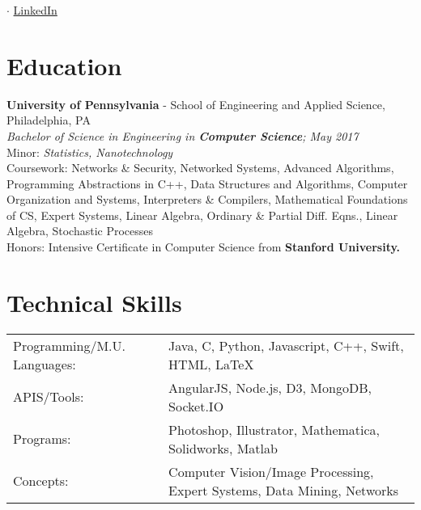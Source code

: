 





\pagestyle{empty}   %

\par{\par}

\par{ $\cdot$ \href{https://www.linkedin.com/in/jtcho}{LinkedIn} \par}
\bigskip


\section{Education}
\textbf{University of Pennsylvania} - School of Engineering and Applied Science, Philadelphia, PA\\
\textit{Bachelor of Science in Engineering in \textbf{Computer Science}; May 2017}\\
Minor: \textit{Statistics, Nanotechnology}\\
Coursework: Networks \& Security, Networked Systems, Advanced Algorithms, Programming Abstractions in C++, Data Structures and Algorithms, Computer Organization and Systems, Interpreters \& Compilers, Mathematical Foundations of CS, Expert Systems, Linear Algebra, Ordinary \& Partial Diff. Eqns., Linear Algebra, Stochastic Processes\\
Honors: Intensive Certificate in Computer Science from \textbf{Stanford University.}

\section{Technical Skills}
\begin{tabular}{l l}
    Programming/M.U. Languages:&Java, C, Python, Javascript, C++, Swift, HTML, \LaTeX\\
               APIS/Tools:&AngularJS, Node.js, D3, MongoDB, Socket.IO\\
                 Programs:&Photoshop, Illustrator, Mathematica, Solidworks, Matlab\\
                 Concepts:&Computer Vision/Image Processing, Expert Systems, Data Mining, Networks
\end{tabular}

